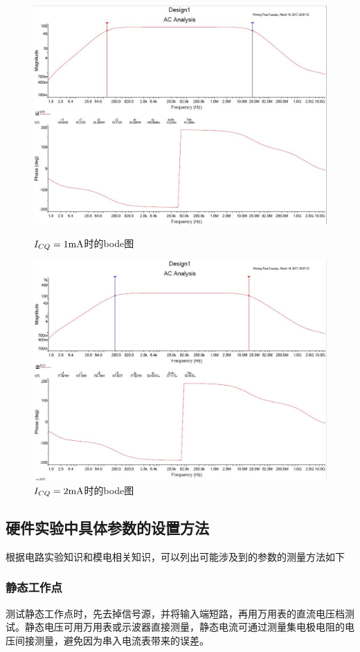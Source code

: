 \documentclass[UTF8,a4paper]{ctexart}
\begin{document}
\begin{figure}
\centering
\includegraphics[width=\textwidth]{b1.jpg}
\caption{$I_{CQ}=1\rm{mA}$时的bode图}
\label{bode1}
\includegraphics[width=\textwidth]{b2.jpg}
\caption{$I_{CQ}=2\rm{mA}$时的bode图}
\label{bode2}
\end{figure}
\subsection{硬件实验中具体参数的设置方法}
根据电路实验知识和模电相关知识，可以列出可能涉及到的参数的测量方法如下
\subsubsection{静态工作点}
测试静态工作点时，先去掉信号源，并将输入端短路，再用万用表的直流电压档测试。静态电压可用万用表或示波器直接测量，静态电流可通过测量集电极电阻的电压间接测量，避免因为串入电流表带来的误差。
\end{document}
